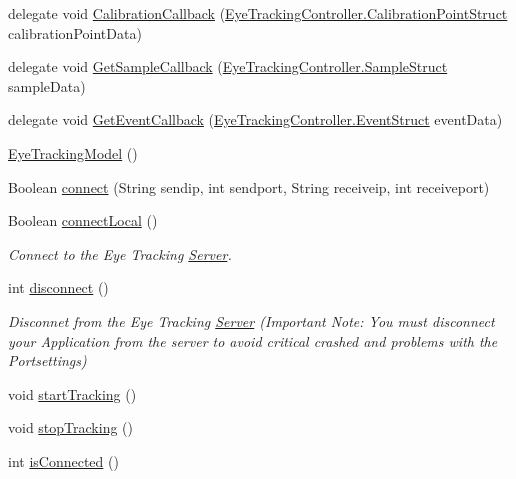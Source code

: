 \begin{DoxyCompactItemize}
\item 
delegate void \hyperlink{class_web_analyzer_1_1_eye_tracking_1_1_eye_tracking_model_ad6c2f20511c53eaf55a8fb18d263b51c}{Calibration\+Callback} (\hyperlink{struct_web_analyzer_1_1_eye_tracking_1_1_eye_tracking_controller_1_1_calibration_point_struct}{Eye\+Tracking\+Controller.\+Calibration\+Point\+Struct} calibration\+Point\+Data)
\item 
delegate void \hyperlink{class_web_analyzer_1_1_eye_tracking_1_1_eye_tracking_model_afa0ffe40b73c90761f49dec896df4baa}{Get\+Sample\+Callback} (\hyperlink{struct_web_analyzer_1_1_eye_tracking_1_1_eye_tracking_controller_1_1_sample_struct}{Eye\+Tracking\+Controller.\+Sample\+Struct} sample\+Data)
\item 
delegate void \hyperlink{class_web_analyzer_1_1_eye_tracking_1_1_eye_tracking_model_a40785479d78104c591e53c7e2847e9ff}{Get\+Event\+Callback} (\hyperlink{struct_web_analyzer_1_1_eye_tracking_1_1_eye_tracking_controller_1_1_event_struct}{Eye\+Tracking\+Controller.\+Event\+Struct} event\+Data)
\item 
\hyperlink{class_web_analyzer_1_1_eye_tracking_1_1_eye_tracking_model_a6be62a4dc74db08b88c80aa8603a06e2}{Eye\+Tracking\+Model} ()
\item 
Boolean \hyperlink{class_web_analyzer_1_1_eye_tracking_1_1_eye_tracking_model_a6e9342c234b6000ba68c03464acb0f50}{connect} (String sendip, int sendport, String receiveip, int receiveport)
\item 
Boolean \hyperlink{class_web_analyzer_1_1_eye_tracking_1_1_eye_tracking_model_a95814ec9f1a4f0d5da70a78c50dd9e22}{connect\+Local} ()
\begin{DoxyCompactList}\small\item\em Connect to the Eye Tracking \hyperlink{namespace_web_analyzer_1_1_server}{Server}. \end{DoxyCompactList}\item 
int \hyperlink{class_web_analyzer_1_1_eye_tracking_1_1_eye_tracking_model_ac340062e8376b59332ecc21e431fd6a1}{disconnect} ()
\begin{DoxyCompactList}\small\item\em Disconnet from the Eye Tracking \hyperlink{namespace_web_analyzer_1_1_server}{Server} (Important Note\+: You must disconnect your Application from the server to avoid critical crashed and problems with the Portsettings) \end{DoxyCompactList}\item 
void \hyperlink{class_web_analyzer_1_1_eye_tracking_1_1_eye_tracking_model_a5f49386b161f435472133e2d1f4762e0}{start\+Tracking} ()
\item 
void \hyperlink{class_web_analyzer_1_1_eye_tracking_1_1_eye_tracking_model_aef3a60c497edbedc9fe8b350f46696b1}{stop\+Tracking} ()
\item 
int \hyperlink{class_web_analyzer_1_1_eye_tracking_1_1_eye_tracking_model_a29a7377e721b88fbd80553699e1d7228}{is\+Connected} ()
\end{DoxyCompactItemize}
